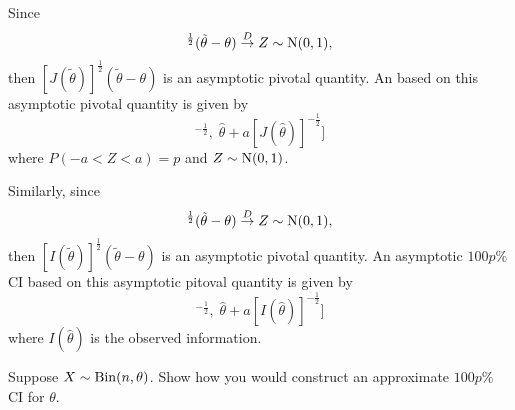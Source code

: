 \documentclass[notoc,notitlepage]{tufte-book}
\newcommand{\convd}{\overset{D}{\to}}
\begin{document}
\begin{propo}
\label{propo:asymptotic_confidence_intervals}
Since
  \begin{equation*}
    [J(\tilde{\theta})]^{\frac{1}{2}} (\tilde{\theta} - \theta) \convd Z \sim \Nor(0, 1),
  \end{equation*}
  then $[J(\tilde{\theta})]^{\frac{1}{2}} (\tilde{\theta} - \theta)$ is an asymptotic pivotal quantity. An  based on this asymptotic pivotal quantity is given by
  \begin{equation*}
    [ \hat{\theta} - a[J(\hat{\theta})]^{-\frac{1}{2}}, \; \hat{\theta} + a[J(\hat{\theta})]^{-\frac{1}{2}} ]
  \end{equation*}
  where $P(-a < Z < a) = p$ and $Z \sim \operatorname{N}(0, 1)$.
\end{propo}

\begin{note}
  Similarly, since
  \begin{equation*}
    [I(\tilde{\theta})]^{\frac{1}{2}} (\tilde{\theta} - \theta) \convd Z \sim \Nor(0, 1),
  \end{equation*}
  then $[I(\tilde{\theta})]^{\frac{1}{2}} (\tilde{\theta} - \theta)$ is an asymptotic pivotal quantity. An asymptotic $100p\%$ CI based on this asymptotic pitoval quantity is given by
  \begin{equation*}
    [ \hat{\theta} - a[I(\hat{\theta})]^{-\frac{1}{2}}, \; \hat{\theta} + a[I(\hat{\theta})]^{-\frac{1}{2}} ]
  \end{equation*}
  where $I(\hat{\theta})$ is the observed information.
\end{note}

\begin{eg}[Example 6.22]
  Suppose $X \sim \operatorname{Bin}(n, \theta)$. Show how you would construct an approximate $100p\%$ CI for $\theta$.\end{eg}
\end{document}
